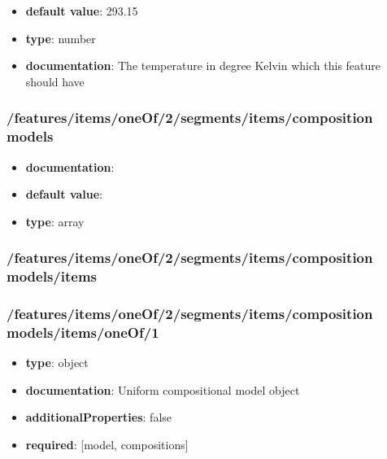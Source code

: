 \begin{itemize}\item {\bf default value}: 293.15
\item {\bf type}: number
\item {\bf documentation}: The temperature in degree Kelvin which this feature should have
\end{itemize}\subsubsection{/features/items/oneOf/2/segments/items/composition models}
\begin{itemize}\item {\bf documentation}: 
\item {\bf default value}: 
\item {\bf type}: array
\end{itemize}\subsubsection{/features/items/oneOf/2/segments/items/composition models/items}

\subsubsection{/features/items/oneOf/2/segments/items/composition models/items/oneOf/1}
\begin{itemize}\item {\bf type}: object
\item {\bf documentation}: Uniform compositional model object
\item {\bf additionalProperties}: false
\item {\bf required}: [model, compositions]\end{itemize}
